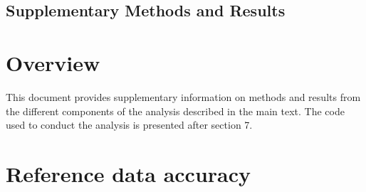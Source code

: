 \documentclass[12pt, titlepage]{article}
\begin{document}
%

\begin{center}\section*{\Large Supplementary Methods and Results}\end{center}
\linenumbers
\section{\large Overview}
This document provides supplementary information on methods and results from the different components of the analysis described in the main text.  The code used to conduct the analysis is presented after section 7.  

\section{\large Reference data accuracy}
\end{document}
